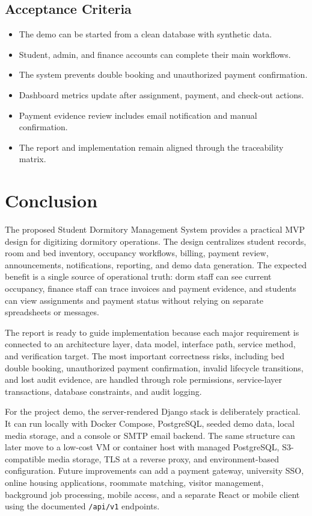 \documentclass[11pt,a4paper]{article}
\begin{document}
\subsection{Acceptance Criteria}
\begin{itemize}
  \item The demo can be started from a clean database with synthetic data.
  \item Student, admin, and finance accounts can complete their main workflows.
  \item The system prevents double booking and unauthorized payment confirmation.
  \item Dashboard metrics update after assignment, payment, and check-out actions.
  \item Payment evidence review includes email notification and manual confirmation.
  \item The report and implementation remain aligned through the traceability matrix.
\end{itemize}

\section{Conclusion}
The proposed Student Dormitory Management System provides a practical MVP design for digitizing dormitory operations. The design centralizes student records, room and bed inventory, occupancy workflows, billing, payment review, announcements, notifications, reporting, and demo data generation. The expected benefit is a single source of operational truth: dorm staff can see current occupancy, finance staff can trace invoices and payment evidence, and students can view assignments and payment status without relying on separate spreadsheets or messages.

The report is ready to guide implementation because each major requirement is connected to an architecture layer, data model, interface path, service method, and verification target. The most important correctness risks, including bed double booking, unauthorized payment confirmation, invalid lifecycle transitions, and lost audit evidence, are handled through role permissions, service-layer transactions, database constraints, and audit logging.

For the project demo, the server-rendered Django stack is deliberately practical. It can run locally with Docker Compose, PostgreSQL, seeded demo data, local media storage, and a console or SMTP email backend. The same structure can later move to a low-cost VM or container host with managed PostgreSQL, S3-compatible media storage, TLS at a reverse proxy, and environment-based configuration. Future improvements can add a payment gateway, university SSO, online housing applications, roommate matching, visitor management, background job processing, mobile access, and a separate React or mobile client using the documented \texttt{/api/v1} endpoints.
\end{document}
